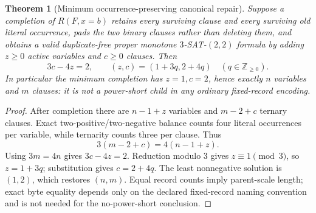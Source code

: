 \documentclass[11pt]{article}
\newtheorem{theorem}{Theorem}
\begin{document}
\begin{theorem}[Minimum occurrence-preserving canonical repair]
Suppose a completion of $R(F,x=b)$ retains every surviving clause and every
surviving old literal occurrence, pads the two binary clauses rather than
deleting them, and obtains a valid duplicate-free proper monotone
$3$-SAT-$(2,2)$ formula by adding $z\ge0$ active variables and $c\ge0$
clauses.  Then
\[
3c-4z=2,
\qquad
(z,c)=(1+3q,2+4q)\quad(q\in\mathbb Z_{\ge0}).
\]
In particular the minimum completion has $z=1,c=2$, hence exactly $n$
variables and $m$ clauses: it is not a power-short child in any ordinary
fixed-record encoding.
\end{theorem}
\begin{proof}
After completion there are $n-1+z$ variables and $m-2+c$ ternary clauses.
Exact two-positive/two-negative balance counts four literal occurrences per
variable, while ternarity counts three per clause.  Thus
\[
3(m-2+c)=4(n-1+z).
\]
Using $3m=4n$ gives $3c-4z=2$.  Reduction modulo $3$ gives $z\equiv1
\pmod3$, so $z=1+3q$; substitution gives $c=2+4q$.  The least nonnegative
solution is $(1,2)$, which restores $(n,m)$.  Equal record counts imply
parent-scale length; exact byte equality depends only on the declared
fixed-record naming convention and is not needed for the no-power-short
conclusion.
\end{proof}
\end{document}

